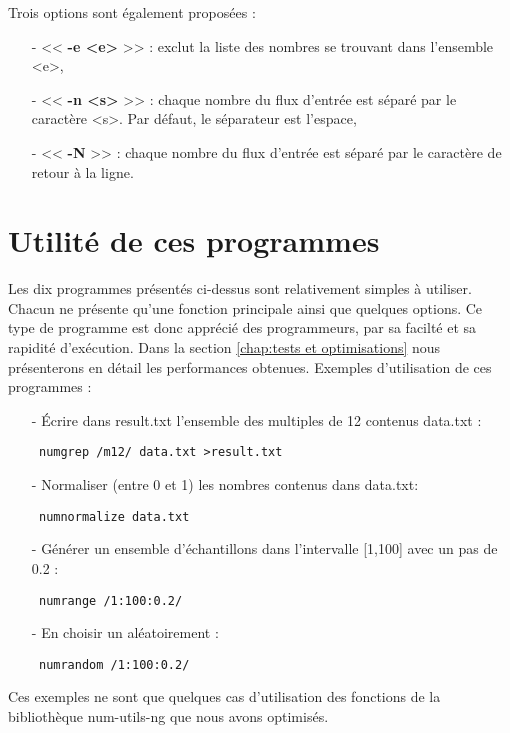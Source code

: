 \begin{itemize}
Trois options sont \'egalement propos\'ees :
\begin{itemize}
 \item[-] << \textbf{-e <e>} >> : exclut la liste des nombres se trouvant dans l'ensemble <e>,
 \item[-] << \textbf{-n <s>} >> : chaque nombre du flux d'entr\'ee est s\'epar\'e par le caract\`ere <s>. Par d\'efaut, le s\'eparateur est l'espace,
 \item[-] << \textbf{-N} >> : chaque nombre du flux d'entr\'ee est s\'epar\'e par le caract\`ere de retour \`a la ligne.
\end{itemize}
\end{itemize}

\section{Utilit\'e de ces programmes}

Les dix programmes pr\'esent\'es ci-dessus sont relativement simples \`a utiliser. Chacun ne pr\'esente qu'une fonction principale ainsi que quelques options.
Ce type de programme est donc appr\'eci\'e des programmeurs, par sa facilt\'e et sa rapidit\'e d'ex\'ecution. Dans la section \ref{chap:tests et optimisations}
nous pr\'esenterons en d\'etail les performances obtenues.
\newline
Exemples d'utilisation de ces programmes :
\begin{itemize}
 \item[-] \'Ecrire dans result.txt l'ensemble des multiples de 12 contenus data.txt :
 \begin{verbatim} numgrep /m12/ data.txt >result.txt \end{verbatim}
 \item[-] Normaliser (entre 0 et 1) les nombres contenus dans data.txt:
 \begin{verbatim} numnormalize data.txt \end{verbatim}
 \item[-] G\'en\'erer un ensemble d'\'echantillons dans l'intervalle [1,100] avec un pas de 0.2 :
 \begin{verbatim} numrange /1:100:0.2/ \end{verbatim}
 \item[-] En choisir un al\'eatoirement :
 \begin{verbatim} numrandom /1:100:0.2/ \end{verbatim}
\end{itemize}

Ces exemples ne sont que quelques cas d'utilisation des fonctions de la biblioth\`eque num-utils-ng que nous avons optimis\'es.


